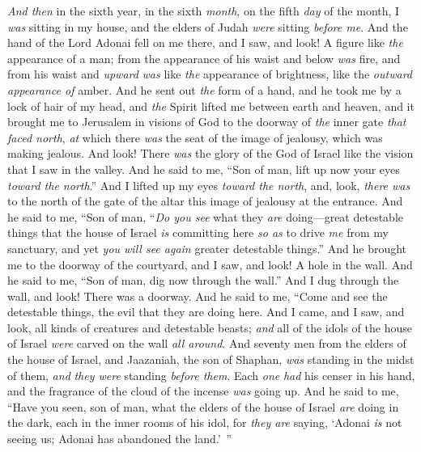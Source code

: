 \begin{biblechapter} %
 \textit{And then} in the sixth year, in the sixth \textit{month}, on the fifth \textit{day} of the month, I \textit{was} sitting in my house, and the elders of Judah \textit{were} sitting \textit{before me}. And the hand of the Lord Adonai fell on me there,
\verse and I saw, and look! A figure like \textit{the} appearance of a man; from the appearance of his waist and below \textit{was} fire, and from his waist and \textit{upward} \textit{was} like \textit{the} appearance of brightness, like the \textit{outward appearance of} amber.
\verse And he sent out \textit{the} form of a hand, and he took me by a lock of hair of my head, and \textit{the} Spirit lifted me between earth and heaven, and it brought me to Jerusalem in visions of God to the doorway of \textit{the} inner gate \textit{that faced north}, \textit{at} which there \textit{was} the seat of the image of jealousy, which was making jealous.
\verse And look! There \textit{was} the glory of the God of Israel like the vision that I saw in the valley.
\verse And he said to me, “Son of man, lift up now your eyes \textit{toward the north}.” And I lifted up my eyes \textit{toward the north}, and, look, \textit{there was} to the north of the gate of the altar this image of jealousy at the entrance.
\verse And he said to me, “Son of man, “\textit{Do you see} what they \textit{are} doing—great detestable things that the house of Israel \textit{is} committing here \textit{so as} to drive \textit{me} from my sanctuary, and yet \textit{you will see again} greater detestable things.”
\verse And he brought me to the doorway of the courtyard, and I saw, and look! A hole in the wall.
\verse And he said to me, “Son of man, dig now through the wall.” And I dug through the wall, and look! There was a doorway.
\verse And he said to me, “Come and see the detestable things, the evil that they are doing here.
\verse And I came, and I saw, and look, all kinds of creatures and detestable beasts; \textit{and} all of the idols of the house of Israel \textit{were} carved on the wall \textit{all around}.
\verse And seventy men from the elders of the house of Israel, and Jaazaniah, the son of Shaphan, \textit{was} standing in the midst of them, \textit{and} \textit{they were} standing \textit{before them}. Each \textit{one} \textit{had} his censer in his hand, and the fragrance of the cloud of the incense \textit{was} going up.
\verse And he said to me, “Have you seen, son of man, what the elders of the house of Israel \textit{are} doing in the dark, each in the inner rooms of his idol, for \textit{they are} saying, ‘Adonai \textit{is} not seeing us; Adonai has abandoned the land.’ ”

\end{biblechapter}
